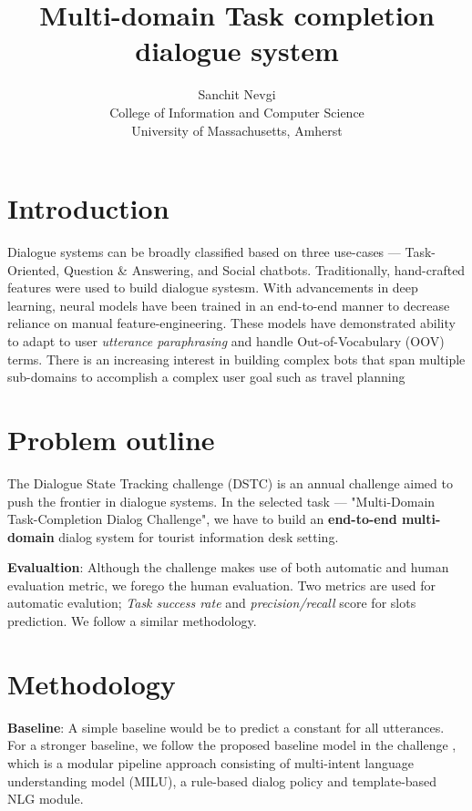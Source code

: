 \documentclass[11pt]{article}
\begin{document}
\title{Multi-domain Task completion dialogue system}

\author{Sanchit Nevgi \\ College of Information and Computer Science \\ University of Massachusetts, Amherst}
\maketitle

\section*{Introduction}
Dialogue systems can be broadly classified based on three use-cases --- Task-Oriented, Question \& Answering, and Social chatbots. Traditionally, hand-crafted features were used to build dialogue systesm. With advancements in deep learning, neural models have been trained in an end-to-end manner to decrease reliance on manual feature-engineering. These models have demonstrated ability to adapt to user \textit{utterance paraphrasing} and handle Out-of-Vocabulary (OOV) terms. There is an increasing interest in building complex bots that span multiple sub-domains to accomplish a complex user goal such as travel planning \cite{li2020results}

\section*{Problem outline}

The Dialogue State Tracking challenge (DSTC) \cite{kim2019eighth} is an annual challenge aimed to push the frontier in dialogue systems. In the selected task --- "Multi-Domain Task-Completion Dialog Challenge", we have to build an \textbf{end-to-end multi-domain} dialog system for tourist information desk setting. 

\medskip \noindent \textbf{Evalualtion}: Although the challenge makes use of both automatic and human evaluation metric, we forego the human evaluation. Two metrics are used for automatic evalution; \textit{Task success rate} and \textit{precision/recall} score for slots prediction. We follow a similar methodology.

\section*{Methodology}

\noindent \textbf{Baseline}: A simple baseline would be to predict a constant for all utterances. For a stronger baseline, we follow the proposed baseline model in the challenge \cite{li2020results}, which is a modular pipeline approach consisting of multi-intent language understanding model (MILU), a rule-based dialog policy and template-based NLG module.
\end{document}
